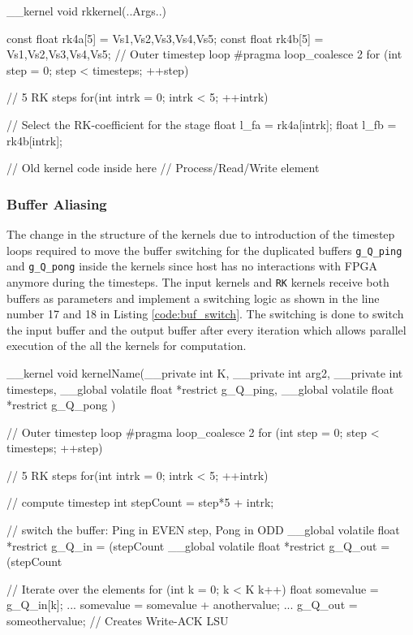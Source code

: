 \begin{CppCode}[caption=Use of Runge-Kutta coefficients inside the \texttt{RK} kernel, frame=tlrb, label=code:rkcoeff, float]
__kernel void rkkernel(..Args..)
{
    const float rk4a[5] = {Vs1,Vs2,Vs3,Vs4,Vs5};
    const float rk4b[5] = {Vs1,Vs2,Vs3,Vs4,Vs5};
    // Outer timestep loop
    #pragma loop_coalesce 2
    for (int step = 0; step < timesteps; ++step)
    {
        // 5 RK steps
        for(int intrk = 0; intrk < 5; ++intrk)
        {
            // Select the RK-coefficient for the stage
            float l_fa = rk4a[intrk];
            float l_fb = rk4b[intrk];

            // Old kernel code inside here
            // Process/Read/Write element
        }
    }
}
\end{CppCode}

\subsubsection*{Buffer Aliasing}

The change in the structure of the kernels due to introduction of the timestep loops
required to move the buffer switching for the duplicated buffers \texttt{g\_Q\_ping} and
\texttt{g\_Q\_pong} inside the kernels since host has no interactions with FPGA anymore
during the timesteps. The input kernels and \texttt{RK} kernels receive both buffers as parameters
and implement a switching logic as shown in the line number 17 and 18 in Listing \ref{code:buf_switch}.
The switching is done to switch the input buffer and the output buffer after every iteration
which allows parallel execution of the all the kernels for computation.
\begin{CppCode}[caption=Buffer switching for FPGA only design within the kernel, frame=tlrb, label=code:buf_switch, float]
__kernel void kernelName(__private int K,  __private int arg2,  __private int timesteps,
                        __global volatile float  *restrict g_Q_ping,
                        __global volatile float  *restrict g_Q_pong
                        )
{
    // Outer timestep loop
    #pragma loop_coalesce 2
    for (int step = 0; step < timesteps; ++step)
    {
        // 5 RK steps
        for(int intrk = 0; intrk < 5; ++intrk)
        {
            // compute timestep
            int stepCount = step*5 + intrk;

            // switch the buffer: Ping in EVEN step, Pong in ODD
            __global volatile float *restrict g_Q_in = (stepCount%
            __global volatile float *restrict g_Q_out = (stepCount%

            // Iterate over the elements
            for (int k = 0; k < K k++)
            {
                float somevalue = g_Q_in[k];
                ...
                somevalue = somevalue + anothervalue;
                ...
                g_Q_out = someothervalue; // Creates Write-ACK LSU
            }
        }
    }
}
\end{CppCode}

